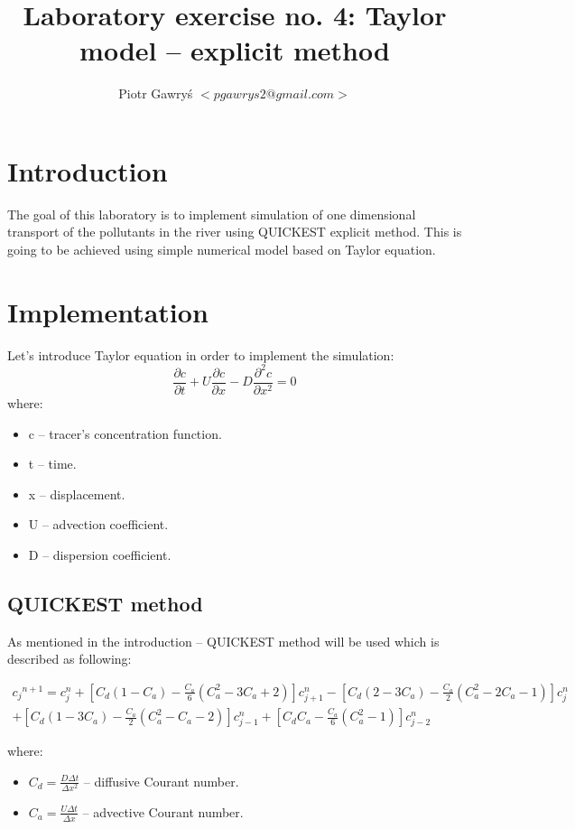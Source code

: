 \documentclass[12pt]{article}
\title{Laboratory exercise no. 4: Taylor model – explicit method}
\author{Piotr Gawry\'s $<pgawrys2@gmail.com>$}
\begin{document}
\maketitle

\section{Introduction}
The goal of this laboratory is to implement simulation of one dimensional transport of the pollutants in the river using QUICKEST explicit method.
This is going to be achieved using simple numerical model based on Taylor equation.

\section{Implementation}

Let's introduce Taylor equation in order to implement the simulation:
\begin{equation}
\frac{\partial c}{\partial t} + U\frac{\partial c}{\partial x} - D\frac{\partial^2 c}{\partial x^2} = 0
\end{equation}
where:
\begin{itemize}
	\item c -- tracer's concentration function.
	\item t -- time.
	\item x -- displacement.
	\item U -- advection coefficient.
	\item D -- dispersion coefficient.
\end{itemize}

\subsection{QUICKEST method}

As mentioned in the introduction -- QUICKEST method will be used which is described as following:

\begin{multline}
{c_j}^{n+1} = {c^n_j} + [C_d(1 - C_a) - \frac{C_a}{6}(C_a^2 - 3C_a + 2)]{c^n_{j+1}} - [C_d(2 - 3C_a) - \frac{C_a}{2}(C_a^2 - 2C_a - 1)]{c^n_{j}}\\ +
[C_d(1 - 3C_a) - \frac{C_a}{2}(C_a^2 - C_a - 2)]{c^n_{j-1}} + 
[C_dC_a - \frac{C_a}{6}(C_a^2 - 1)]{c^n_{j-2}}
\end{multline}

where:
\begin{itemize}
	\item $C_d = \frac{D\Delta t}{\Delta x^2}$ -- diffusive Courant number.
	\item $C_a = \frac{U\Delta t}{\Delta x}$ -- advective Courant number.
\end{itemize}
\end{document}
